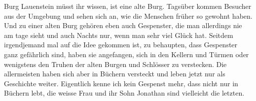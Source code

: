 Burg Lauenstein müsst ihr wissen, ist eine alte Burg. Tagsüber kommen Besucher aus der Umgebung und sehen sich an, wie die Menschen früher so gewohnt haben. Und zu einer alten Burg gehören eben auch Gespenster, die man allerdings nie am tage sieht und auch Nachts nur, wenn man sehr viel Glück hat. Seitdem irgendjemand mal auf die Idee gekommen ist, zu behaupten, dass Gespenster ganz gefährlich sind, haben sie angefangen, sich in den Kellern und Türmen oder wenigstens den Truhen der alten Burgen und Schlösser zu verstecken. Die allermeisten haben sich aber in Büchern versteckt und leben jetzt nur als Geschichte weiter. Eigentlich kenne ich kein Gespenst mehr, dass nicht nur in Büchern lebt, die weisse Frau und ihr Sohn Jonathan sind vielleicht die letzten.


